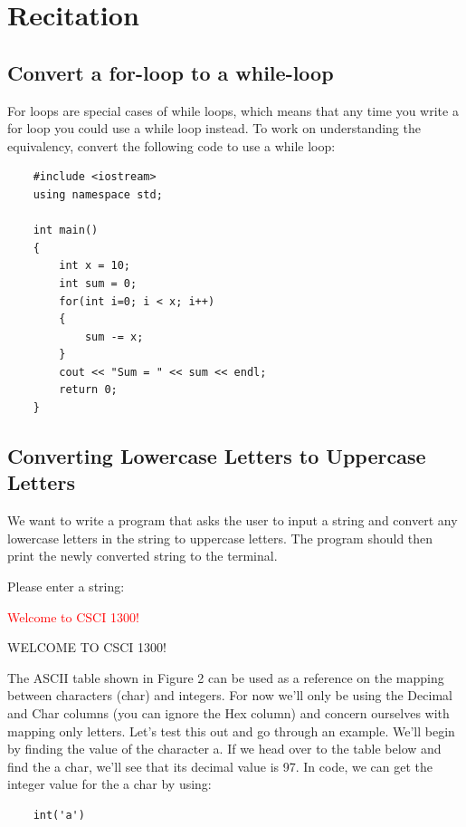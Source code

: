 \section{Recitation}

\subsection{Convert a for-loop to a while-loop}
For loops are special cases of while loops, which means that any time you write a for loop you could use a while loop instead. To work on understanding the equivalency, convert the following code to use a while loop:

\begin{verbatim}
    #include <iostream>
    using namespace std;
    
    int main()
    {
        int x = 10;
        int sum = 0;
        for(int i=0; i < x; i++)
        {
            sum -= x;
        }
        cout << "Sum = " << sum << endl;
        return 0;
    }
\end{verbatim}

\subsection{Converting Lowercase Letters to Uppercase Letters}
We want to write a program that asks the user to input a string and convert any lowercase letters in the string to uppercase letters. The program should then print the newly converted string to the terminal.

\begin{sample}
    
    Please enter a string:
    
    \textcolor{red}{Welcome to CSCI 1300!}
    
    WELCOME TO CSCI 1300!
\end{sample}

The ASCII table shown in Figure 2 can be used as a reference on the mapping between characters (char) and integers. For now we'll only be using the Decimal and Char columns (you can ignore the Hex column) and concern ourselves with mapping only letters. Let's test this out and go through an example. We'll begin by finding the value of the character a. If we head over to the table below and find the a char, we'll see that its decimal value is 97. In code, we can get the integer value for the a char by using: 
\begin{verbatim}
    int('a')
\end{verbatim}

